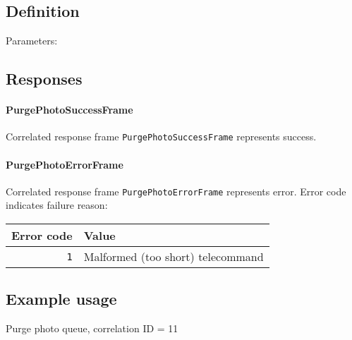 \subsection{Definition}

Parameters: 

\begin{tcarglist}
\end{tcarglist}


\subsection{Responses}

\paragraph{PurgePhotoSuccessFrame}
Correlated response frame \texttt{PurgePhotoSuccessFrame} represents success. 

\paragraph{PurgePhotoErrorFrame}
Correlated response frame \texttt{PurgePhotoErrorFrame} represents error. Error code indicates failure reason:

\begin{tabular}{r | l}
	Error code & Value \\
	\hline
	\texttt{1} & Malformed (too short) telecommand \\	
\end{tabular}


\subsection{Example usage}
Purge photo queue, correlation ID = 11

